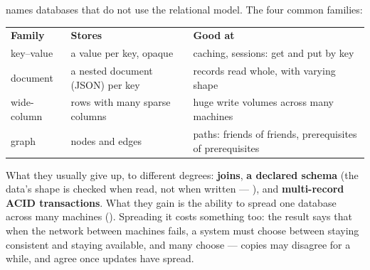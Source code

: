 \begin{definitionbox}
 names databases that do not use the relational model. The four
common families:

\smallskip
\begin{tabular}{@{}L{3.0cm}L{4.6cm}L{6.2cm}@{}}
\textbf{Family} & \textbf{Stores} & \textbf{Good at} \\
key--value & a value per key, opaque & caching, sessions: get and put by key \\
document & a nested document (JSON) per key & records read whole, with
  varying shape \\
wide-column & rows with many sparse columns & huge write volumes across many
  machines \\
graph & nodes and edges & paths: friends of friends, prerequisites of
  prerequisites \\
\end{tabular}

\smallskip
What they usually give up, to different degrees: \textbf{joins},
\textbf{a declared schema} (the data's shape is checked when read, not when
written --- ), and \textbf{multi-record ACID
transactions}. What they gain is the ability to spread one database across
many machines (). Spreading it costs
something too: the  result says that when the network between
machines fails, a system must choose between staying consistent and staying
available, and many choose  --- copies may
disagree for a while, and agree once updates have spread.
\end{definitionbox}

